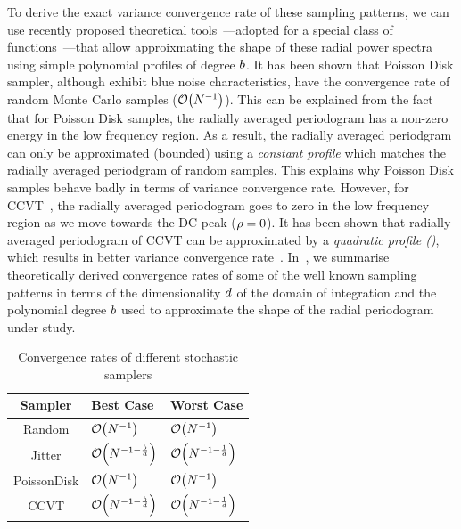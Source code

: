 \documentclass[11pt,fleqn]{book} %
\begin{document}
To derive the exact variance convergence rate of these sampling patterns, we can use recently proposed theoretical tools~\cite{Pilleboue:2015:VAM}---adopted for a special class of functions~\cite{brandolini2001}---that allow approixmating the shape of these radial power spectra using simple polynomial profiles of degree $b$. It has been shown that Poisson Disk sampler, although exhibit blue noise characteristics, have the convergence rate of random Monte Carlo samples ($\mathcal{O}\!\left(N^{-1}\right)$). This can be explained from the fact that for Poisson Disk samples, the radially averaged periodogram has a non-zero energy in the low frequency region. As a result, the  radially averaged periodgram can only be approximated (bounded) using a \emph{constant profile} which matches the radially averaged periodgram of random samples. This explains why Poisson Disk samples  behave badly in terms of variance convergence rate. However, for CCVT~\cite{Balzer:2009:CPD:1531326.1531392}, the radially averaged periodogram goes to zero in the low frequency region as we move towards the DC peak ($\rho=0$). It has been shown that radially averaged periodogram of CCVT can be approximated by a \emph{quadratic profile ()}, which results in better variance convergence rate~\cite{Pilleboue:2015:VAM}. In~, we summarise theoretically derived convergence rates of some of the well known sampling patterns in terms of the dimensionality ${d}$ of the domain of integration and the polynomial degree $b$ used to approximate the shape of the radial periodogram under study. 

\begin{table}[ht]
  \centering
  \caption{Convergence rates of different stochastic samplers}
  \label{tab:convergencerates}
  \begin{tabular}{|c|l|l|}
    \hline
    Sampler & Best Case & Worst Case \\
    \hline
    Random & $\mathcal{O}\!\left(N^{-1}\right)$ & $\mathcal{O}\!\left(N^{-1}\right)$ \\
    Jitter &  $\mathcal{O}\!\left(N^{-1-\frac{b}{d}}\right)$ & $\mathcal{O}\!\left(N^{-1-\frac{1}{d}}\right)$\\ 
    PoissonDisk & $\mathcal{O}\!\left(N^{-1}\right)$ & $\mathcal{O}\!\left(N^{-1}\right)$\\
    CCVT & $\mathcal{O}\!\left(N^{-1-\frac{b}{d}}\right)$ & $\mathcal{O}\!\left(N^{-1-\frac{1}{d}}\right)$ \\ 
    \hline
  \end{tabular}
\end{table}
\end{document}
